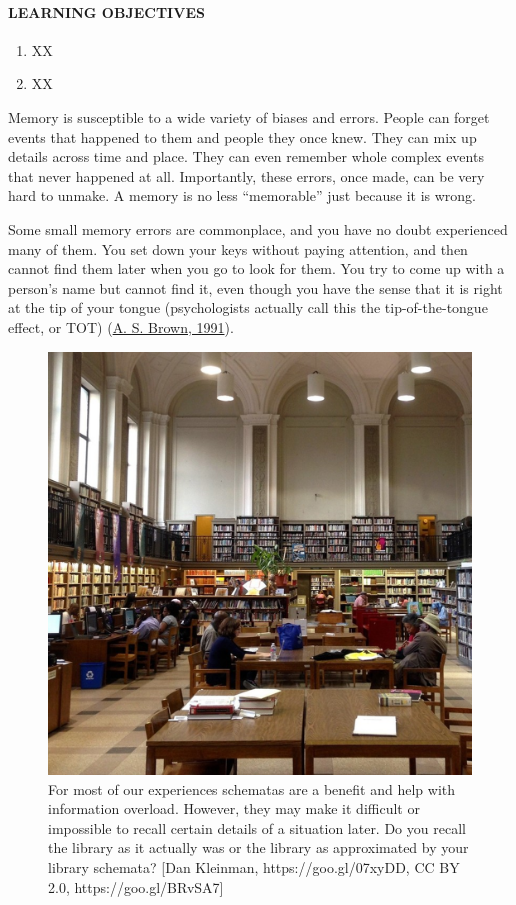\documentclass[
]{krantz}
\providecommand{\tightlist}{%
  \setlength{\itemsep}{0pt}\setlength{\parskip}{0pt}}
\begin{document}
\hypertarget{learning-objectives-5}{%
\paragraph*{LEARNING OBJECTIVES}\label{learning-objectives-5}}

\begin{enumerate}
\def\labelenumi{\arabic{enumi}.}
\tightlist
\item
  XX
\item
  XX
\end{enumerate}

Memory is susceptible to a wide variety of biases and errors. People can forget events that happened to them and people they once knew. They can mix up details across time and place. They can even remember whole complex events that never happened at all. Importantly, these errors, once made, can be very hard to unmake. A memory is no less ``memorable'' just because it is wrong.

Some small memory errors are commonplace, and you have no doubt experienced many of them. You set down your keys without paying attention, and then cannot find them later when you go to look for them. You try to come up with a person's name but cannot find it, even though you have the sense that it is right at the tip of your tongue (psychologists actually call this the tip-of-the-tongue effect, or TOT) (\protect\hyperlink{ref-Brown1991}{A. S. Brown, 1991}).

\begin{figure}

{\centering \includegraphics[width=0.6\linewidth]{images/ch6/fig1} 

}

\caption{For most of our experiences schematas are a benefit and help with information overload. However, they may make it difficult or impossible to recall certain details of a situation later. Do you recall the library as it actually was or the library as approximated by your library schemata? [Dan Kleinman, https://goo.gl/07xyDD, CC BY 2.0, https://goo.gl/BRvSA7]}\label{fig:library2}
\end{figure}
\end{document}
